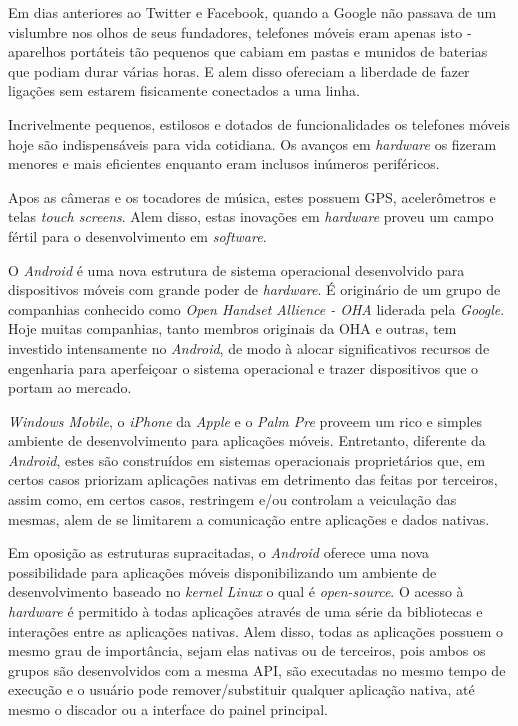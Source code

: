 \documentclass[12pt,a4paper,oneside]{report}
\begin{document}
Em dias anteriores ao Twitter e Facebook, quando a Google não passava de um vislumbre nos olhos de seus fundadores, telefones móveis eram apenas isto - aparelhos portáteis tão pequenos que cabiam em pastas e munidos de baterias que podiam durar várias horas. E alem disso ofereciam a liberdade de fazer ligações sem estarem fisicamente conectados a uma linha.

Incrivelmente pequenos, estilosos e dotados de funcionalidades os telefones móveis hoje são indispensáveis para vida cotidiana. Os avanços em \emph{hardware} os fizeram menores e mais eficientes enquanto eram inclusos inúmeros periféricos.

Apos as câmeras e os tocadores de música, estes possuem GPS, acelerômetros e telas \emph{touch screens}. Alem disso, estas inovações em \emph{hardware} proveu um campo fértil para o desenvolvimento em \emph{software}.

O \emph{Android} é uma nova estrutura de sistema operacional desenvolvido para dispositivos móveis com grande poder de \emph{hardware}. É originário de um grupo de companhias conhecido como \emph{Open Handset Allience - OHA} liderada pela \emph{Google}. Hoje muitas companhias, tanto membros originais da OHA e outras, tem investido intensamente no \emph{Android}, de modo à alocar significativos recursos de engenharia para aperfeiçoar o sistema operacional e trazer dispositivos que o portam ao mercado.

\emph{Windows Mobile}, o \emph{iPhone} da \emph{Apple} e o \emph{Palm Pre} proveem um rico e simples ambiente de desenvolvimento para aplicações móveis. Entretanto, diferente da \emph{Android}, estes são construídos em sistemas operacionais proprietários que, em certos casos priorizam aplicações nativas em detrimento das feitas por terceiros, assim como, em certos casos, restringem e/ou controlam a veiculação das mesmas, alem de se limitarem a comunicação entre aplicações e dados nativas.

Em oposição as estruturas supracitadas, o \emph{Android} oferece uma nova possibilidade para aplicações móveis disponibilizando um ambiente de desenvolvimento baseado no \emph{kernel Linux} o qual é \emph{open-source}. O acesso à \emph{hardware} é permitido à todas aplicações através de uma série da bibliotecas e interações entre as aplicações nativas. Alem disso, todas as aplicações possuem o mesmo grau de importância, sejam elas nativas ou de terceiros, pois ambos os grupos são desenvolvidos com a mesma API, são executadas no mesmo tempo de execução e o usuário pode remover/substituir qualquer aplicação nativa, até mesmo o discador ou a interface do painel principal.
\end{document}
